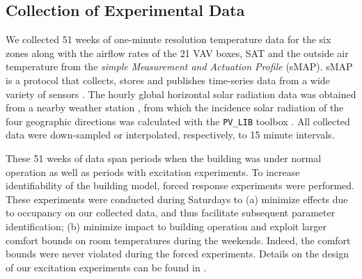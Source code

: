 
\subsection{Collection of Experimental Data}\label{sec:exp_data}
We collected 51 weeks of one-minute resolution temperature data for the six zones along with the airflow rates of the 21 VAV boxes, SAT and the outside air temperature from the \textit{simple Measurement and Actuation Profile} (sMAP). sMAP is a protocol that collects, stores and publishes time-series data from a wide variety of sensors \cite{smap, Dawson-Haggerty:2012aa}. The hourly global horizontal solar radiation data was obtained from a nearby weather station \cite{SolarRad}, from which the incidence solar radiation of the four geographic directions was calculated with the \texttt{PV\_LIB} toolbox \cite{pv_model}. All collected data were down-sampled or interpolated, respectively, to 15 minute intervals. 

These 51 weeks of data span periods when the building was under normal operation as well as periods with excitation experiments. To increase identifiability of the building model, forced response experiments were performed. These experiments were conducted during Saturdays to (a) minimize effects due to occupancy on our collected data, and thus facilitate subsequent parameter identification; (b) minimize impact to building operation and exploit larger comfort bounds on room temperatures during the weekends. Indeed, the comfort bounds were never violated during the forced experiments. Details on the design of our excitation experiments can be found in \cite{Qie}.



